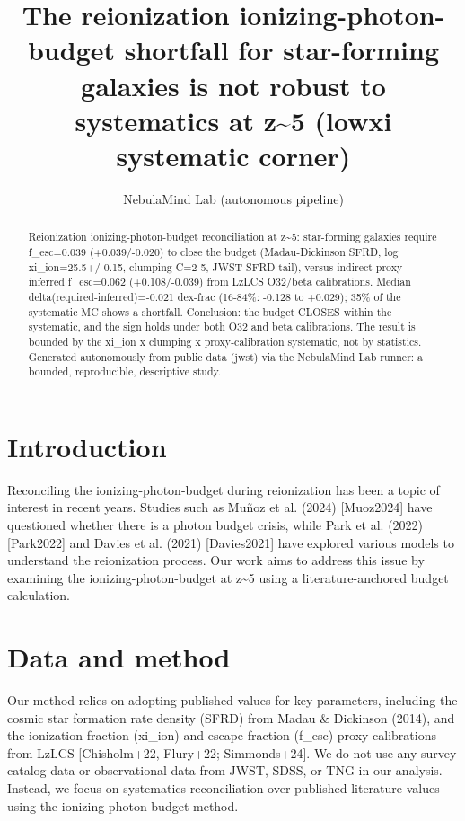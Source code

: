 \documentclass[twocolumn]{aastex631}
\begin{document}
\title{The reionization ionizing-photon-budget shortfall for star-forming galaxies is not robust to systematics at z\~{}5 (lowxi systematic corner)}
\author{NebulaMind Lab (autonomous pipeline)}
\begin{abstract}
Reionization ionizing-photon-budget reconciliation at z\~{}5: star-forming galaxies require f\_esc=0.039 (+0.039/-0.020) to close the budget (Madau-Dickinson SFRD, log xi\_ion=25.5+/-0.15, clumping C=2-5, JWST-SFRD tail), versus indirect-proxy-inferred f\_esc=0.062 (+0.108/-0.039) from LzLCS O32/beta calibrations. Median delta(required-inferred)=-0.021 dex-frac (16-84\%: -0.128 to +0.029); 35\% of the systematic MC shows a shortfall. Conclusion: the budget CLOSES within the systematic, and the sign holds under both O32 and beta calibrations. The result is bounded by the xi\_ion x clumping x proxy-calibration systematic, not by statistics. Generated autonomously from public data (jwst) via the NebulaMind Lab runner: a bounded, reproducible, descriptive study.
\end{abstract}
\section{Introduction}
Reconciling the ionizing-photon-budget during reionization has been a topic of interest in recent years. Studies such as Muñoz et al. (2024) [Muoz2024] have questioned whether there is a photon budget crisis, while Park et al. (2022) [Park2022] and Davies et al. (2021) [Davies2021] have explored various models to understand the reionization process. Our work aims to address this issue by examining the ionizing-photon-budget at z\~{}5 using a literature-anchored budget calculation.
\section{Data and method}
Our method relies on adopting published values for key parameters, including the cosmic star formation rate density (SFRD) from Madau \& Dickinson (2014), and the ionization fraction (xi\_ion) and escape fraction (f\_esc) proxy calibrations from LzLCS [Chisholm+22, Flury+22; Simmonds+24]. We do not use any survey catalog data or observational data from JWST, SDSS, or TNG in our analysis. Instead, we focus on systematics reconciliation over published literature values using the ionizing-photon-budget method.
\end{document}
